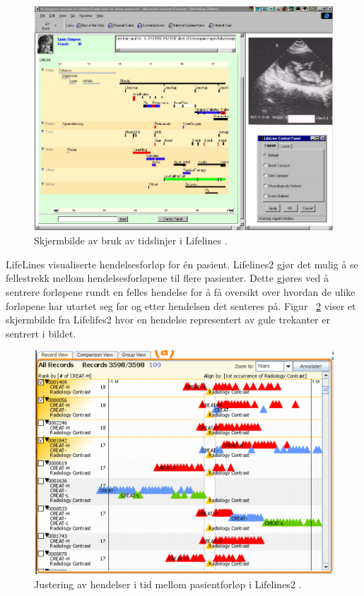 \begin{figure}[H]
  \centering
    \includegraphics[width=1\textwidth]{fig/litteratursok/lifeline_timeline.PNG}
  \caption{Skjermbilde av bruk av tidslinjer i Lifelines \citep{rind2011interactive}. }
\label{fig:lifeline_timeline}
\end{figure}

LifeLines visualiserte hendelsesforløp for én pasient. Lifelines2 gjør det mulig å se fellestrekk mellom hendelsesforløpene til flere pasienter. Dette gjøres ved å sentrere forløpene rundt en felles hendelse for å få oversikt over hvordan de ulike forløpene har utartet seg før og etter hendelsen det senteres på. Figur ~\ref{fig:lifelines2} viser et skjermbilde fra Lifelifes2 hvor en hendelse representert av gule trekanter er sentrert i bildet. 

\begin{figure}[H]
  \centering
    \includegraphics[width=1\textwidth]{fig/litteratursok/lifelines2.PNG}
  \caption{Justering av hendelser i tid mellom pasientforløp i Lifelines2 \citep{rind2011interactive}.}
\label{fig:lifelines2}
\end{figure}

